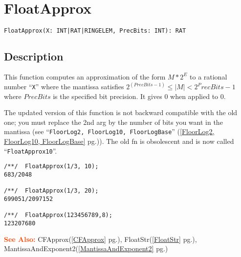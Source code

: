 \documentclass[a4paper]{mybook}
\newenvironment{command}{}{} %
\newcommand\SeeAlso{\par\textcolor{OrangeRed}{\textbf{\large See Also: }}}
\begin{document}
\section{FloatApprox}
\label{FloatApprox}
\begin{command} %


\begin{Verbatim}[label=syntax, rulecolor=\color{MidnightBlue},
frame=single]
FloatApprox(X: INT|RAT|RINGELEM, PrecBits: INT): RAT
  \end{Verbatim}


\subsection*{Description}

This function computes an approximation of the form $M*2^E$ to a rational number
``\verb&X&'' where the mantissa satisfies $2^(PrecBits-1) \le  |M| < 2^PrecBits-1$ where
$PrecBits$ is the specified bit precision.  It gives 0 when applied to 0.
\par 
The updated version of this function is not backward compatible with the
old one; you must replace the 2nd arg by the number of bits you want in
the mantissa (see ``\verb&FloorLog2, FloorLog10, FloorLogBase&'' (\ref{FloorLog2, FloorLog10, FloorLogBase} pg.\pageref{FloorLog2, FloorLog10, FloorLogBase})).
The old fn is obsolescent and is now called ``\verb&FloatApprox10&''.
\begin{Verbatim}[label=example, rulecolor=\color{PineGreen}, frame=single]
/**/  FloatApprox(1/3, 10);
683/2048

/**/  FloatApprox(1/3, 20);
699051/2097152

/**/  FloatApprox(123456789,8);
123207680
\end{Verbatim}


\SeeAlso %
  CFApprox(\ref{CFApprox} pg.\pageref{CFApprox}), 
    FloatStr(\ref{FloatStr} pg.\pageref{FloatStr}), 
    MantissaAndExponent2(\ref{MantissaAndExponent2} pg.\pageref{MantissaAndExponent2})
\end{command} %
\end{document}
